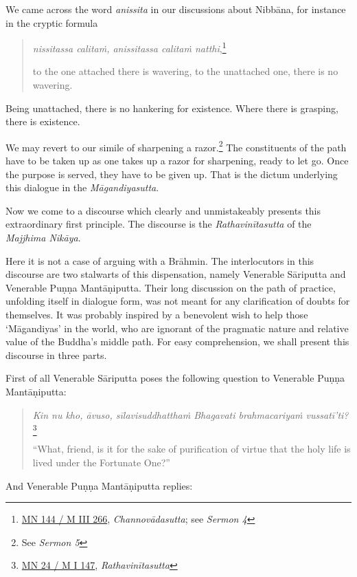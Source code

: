 We came across the word \emph{anissita} in our discussions about Nibbāna, for instance in the cryptic formula

\begin{quote}
\emph{nissitassa calitaṁ, anissitassa calitaṁ natthi},\footnote{\href{https://suttacentral.net/mn144/pli/ms}{MN 144 / M III 266}, \emph{Channovādasutta}; see \emph{Sermon 4}}

to the one attached there is wavering, to the unattached one, there is no wavering.
\end{quote}

Being unattached, there is no hankering for existence. Where there is grasping, there is existence.

We may revert to our simile of sharpening a razor.\footnote{See \emph{Sermon 5}} The constituents of the path have to be taken up as one takes up a razor for sharpening, ready to let go. Once the purpose is served, they have to be given up. That is the dictum underlying this dialogue in the \emph{Māgandiyasutta}.

Now we come to a discourse which clearly and unmistakeably presents this extraordinary first principle. The discourse is the \emph{Rathavinītasutta} of the \emph{Majjhima Nikāya}.

Here it is not a case of arguing with a Brāhmin. The interlocutors in this discourse are two stalwarts of this dispensation, namely Venerable Sāriputta and Venerable Puṇṇa Mantāṇiputta. Their long discussion on the path of practice, unfolding itself in dialogue form, was not meant for any clarification of doubts for themselves. It was probably inspired by a benevolent wish to help those `Māgandiyas' in the world, who are ignorant of the pragmatic nature and relative value of the Buddha's middle path. For easy comprehension, we shall present this discourse in three parts.

First of all Venerable Sāriputta poses the following question to Venerable Puṇṇa Mantāṇiputta:

\begin{quote}
\emph{Kin nu kho, āvuso, sīlavisuddhatthaṁ Bhagavati brahmacariyaṁ vussatī'ti?}\footnote{\href{https://suttacentral.net/mn24/pli/ms}{MN 24 / M I 147}, \emph{Rathavinītasutta}}

``What, friend, is it for the sake of purification of virtue that the holy life is lived under the Fortunate One?''
\end{quote}

And Venerable Puṇṇa Mantāṇiputta replies:

